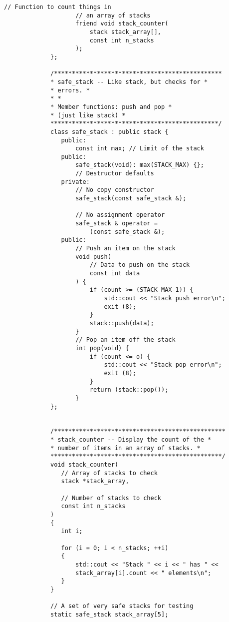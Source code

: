 \begin{LTR}
\begin{lstlisting}[style=C++Style]
             		// Function to count things in
             		// an array of stacks
             		friend void stack_counter(
             			stack stack_array[],
             			const int n_stacks
             		);
             };

             /***********************************************
             * safe_stack -- Like stack, but checks for *
             * errors. *
             * *
             * Member functions: push and pop *
             * (just like stack) *
             ***********************************************/
             class safe_stack : public stack {
             	public:
             		const int max; // Limit of the stack
             	public:
             		safe_stack(void): max(STACK_MAX) {};
             		// Destructor defaults
             	private:
             		// No copy constructor
             		safe_stack(const safe_stack &);

             		// No assignment operator
             		safe_stack & operator =
             			(const safe_stack &);
             	public:
             		// Push an item on the stack
             		void push(
             			// Data to push on the stack
             			const int data
             		) {
             			if (count >= (STACK_MAX-1)) {
             				std::cout << "Stack push error\n";
             				exit (8);
             			}
             			stack::push(data);
             		}
             		// Pop an item off the stack
             		int pop(void) {
             			if (count <= o) {
             				std::cout << "Stack pop error\n";
             				exit (8);
             			}
             			return (stack::pop());
             		}
             };


             /************************************************
             * stack_counter -- Display the count of the *
             * number of items in an array of stacks. *
             ************************************************/
             void stack_counter(
             	// Array of stacks to check
             	stack *stack_array,

             	// Number of stacks to check
             	const int n_stacks
             )
             {
             	int i;

             	for (i = 0; i < n_stacks; ++i)
             	{
             		std::cout << "Stack " << i << " has " <<
             		stack_array[i].count << " elements\n";
             	}
             }

             // A set of very safe stacks for testing
             static safe_stack stack_array[5];


\end{lstlisting}
\end{LTR}
